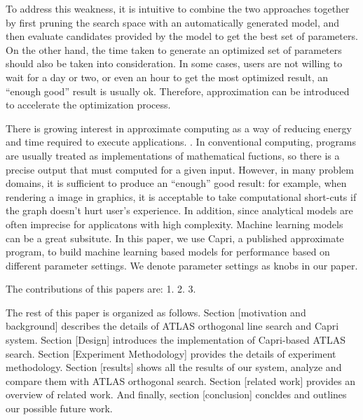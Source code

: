 \par
To address this weakness, it is intuitive to combine the two approaches together by first pruning the search
space with an automatically generated model, and then evaluate candidates
provided by the model to get the best set of parameters.
On the other hand, the time taken to generate an optimized set of parameters
should also be taken into consideration. In some cases, users are not willing
to wait for a day or two, or even an hour to get the most optimized result, an
``enough good'' result is usually ok. Therefore, approximation can be introduced
to accelerate the optimization process.

There is growing interest in approximate computing as a way of reducing energy
and time required to execute applications. \cite{ansel2011language,
baek2010green, sidiroglou2011managing, swaminathan2015case}. In conventional
computing, programs are usually treated as implementations of mathematical
fuctions, so there is a precise output that must computed for a given input.
However, in many problem domains, it is sufficient to produce an ``enough''
good result: for example, when rendering a image in graphics, it is
acceptable to take computational short-cuts if the graph doesn't hurt user's
experience. In addition, since analytical models are often imprecise for
applicatons with high complexity. Machine learning models can be a great
subsitute. In this paper, we use Capri\cite{sui2016proactive}, a published
approximate program, to build machine learning based models for \gem performance
based on different parameter settings. We denote parameter settings as knobs in
our paper.

The contributions of this papers are:
1.
2.
3.

\par
The rest of this paper is organized as follows. Section [motivation and background] describes the details of ATLAS
orthogonal line search and Capri system.
Section [Design] introduces the implementation of Capri-based ATLAS search.
Section [Experiment Methodology] provides the details of experiment methodology.
Section [results] shows all the results of our system, analyze and compare them with ATLAS orthogonal search.
Section [related work] provides an overview of related work.
And finally, section [conclusion] concldes and outlines our possible future work.
